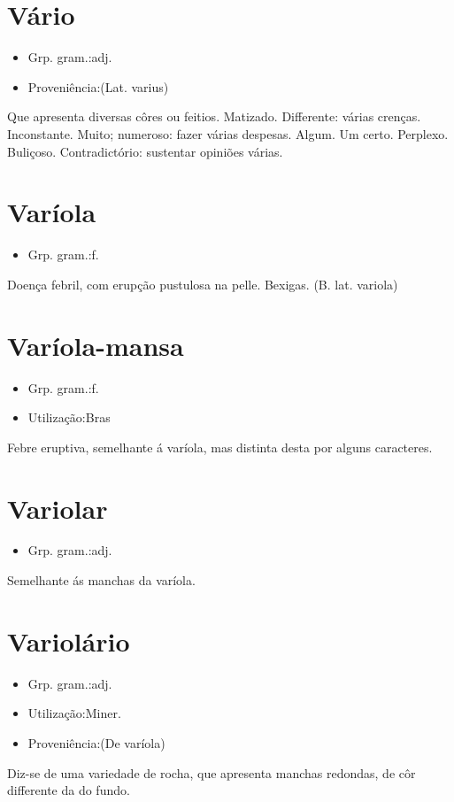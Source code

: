 \documentclass{article}
\begin{document}
\section{Vário}
\begin{itemize}
\item {Grp. gram.:adj.}
\end{itemize}
\begin{itemize}
\item {Proveniência:(Lat. \textunderscore varius\textunderscore )}
\end{itemize}
Que apresenta diversas côres ou feitios.
Matizado.
Differente: \textunderscore várias crenças\textunderscore .
Inconstante.
Muito; numeroso: \textunderscore fazer várias despesas\textunderscore .
Algum.
Um certo.
Perplexo.
Buliçoso.
Contradictório: \textunderscore sustentar opiniões várias\textunderscore .
\section{Varíola}
\begin{itemize}
\item {Grp. gram.:f.}
\end{itemize}
Doença febril, com erupção pustulosa na pelle.
Bexigas.
(B. lat. \textunderscore variola\textunderscore )
\section{Varíola-mansa}
\begin{itemize}
\item {Grp. gram.:f.}
\end{itemize}
\begin{itemize}
\item {Utilização:Bras}
\end{itemize}
Febre eruptiva, semelhante á varíola, mas distinta desta por alguns caracteres.
\section{Variolar}
\begin{itemize}
\item {Grp. gram.:adj.}
\end{itemize}
Semelhante ás manchas da varíola.
\section{Variolário}
\begin{itemize}
\item {Grp. gram.:adj.}
\end{itemize}
\begin{itemize}
\item {Utilização:Miner.}
\end{itemize}
\begin{itemize}
\item {Proveniência:(De \textunderscore varíola\textunderscore )}
\end{itemize}
Diz-se de uma variedade de rocha, que apresenta manchas redondas, de côr differente da do fundo.
\end{document}

